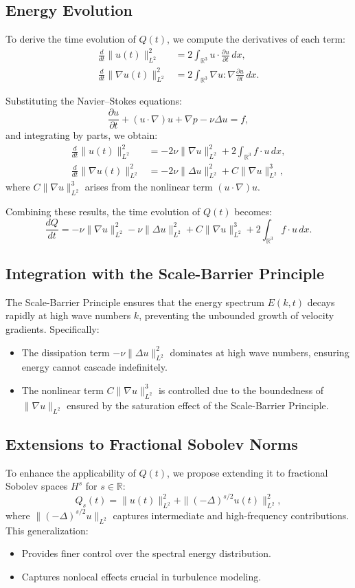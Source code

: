 \documentclass[12pt]{article}
\theoremstyle{definition}
\begin{document}
\subsection{Energy Evolution}
To derive the time evolution of $Q(t)$, we compute the derivatives of each term:
\begin{align*}
\frac{d}{dt} \|u(t)\|_{L^2}^2 &= 2 \int_{\mathbb{R}^3} u \cdot \frac{\partial u}{\partial t} \, dx, \\
\frac{d}{dt} \|\nabla u(t)\|_{L^2}^2 &= 2 \int_{\mathbb{R}^3} \nabla u : \nabla \frac{\partial u}{\partial t} \, dx.
\end{align*}

Substituting the Navier--Stokes equations:
\[
\frac{\partial u}{\partial t} + (u \cdot \nabla)u + \nabla p - \nu \Delta u = f,
\]
and integrating by parts, we obtain:
\begin{align*}
\frac{d}{dt} \|u(t)\|_{L^2}^2 &= -2\nu \|\nabla u\|_{L^2}^2 + 2 \int_{\mathbb{R}^3} f \cdot u \, dx, \\
\frac{d}{dt} \|\nabla u(t)\|_{L^2}^2 &= -2\nu \|\Delta u\|_{L^2}^2 + C \|\nabla u\|_{L^2}^3,
\end{align*}
where $C \|\nabla u\|_{L^2}^3$ arises from the nonlinear term $(u \cdot \nabla)u$.

Combining these results, the time evolution of $Q(t)$ becomes:
\[
\frac{dQ}{dt} = -\nu \|\nabla u\|_{L^2}^2 - \nu \|\Delta u\|_{L^2}^2 + C \|\nabla u\|_{L^2}^3 + 2 \int_{\mathbb{R}^3} f \cdot u \, dx.
\]

\subsection{Integration with the Scale-Barrier Principle}
The Scale-Barrier Principle ensures that the energy spectrum $E(k, t)$ decays rapidly at high wave numbers $k$, preventing the unbounded growth of velocity gradients. Specifically:
\begin{itemize}
    \item The dissipation term $-\nu \|\Delta u\|_{L^2}^2$ dominates at high wave numbers, ensuring energy cannot cascade indefinitely.
    \item The nonlinear term $C \|\nabla u\|_{L^2}^3$ is controlled due to the boundedness of $\|\nabla u\|_{L^2}$ ensured by the saturation effect of the Scale-Barrier Principle.
\end{itemize}

\subsection{Extensions to Fractional Sobolev Norms}
To enhance the applicability of $Q(t)$, we propose extending it to fractional Sobolev spaces $H^s$ for $s \in \mathbb{R}$:
\[
Q_s(t) = \|u(t)\|_{L^2}^2 + \|(-\Delta)^{s/2} u(t)\|_{L^2}^2,
\]
where $\|(-\Delta)^{s/2} u\|_{L^2}$ captures intermediate and high-frequency contributions. This generalization:
\begin{itemize}
    \item Provides finer control over the spectral energy distribution.
    \item Captures nonlocal effects crucial in turbulence modeling.
\end{itemize}
\end{document}

